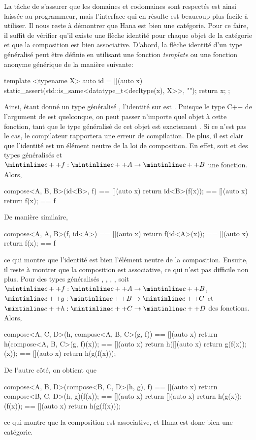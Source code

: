 La tâche de s'assurer que les domaines et codomaines sont respectés est ainsi
laissée au programmeur, mais l'interface qui en résulte est beaucoup plus
facile à utiliser. Il nous reste à démontrer que Hana est bien une catégorie.
Pour ce faire, il suffit de vérifier qu'il existe une flèche identité pour
chaque objet de la catégorie et que la composition est bien associative.
D'abord, la flèche identité d'un type généralisé peut être définie en
utilisant une fonction \textit{template} ou une fonction anonyme générique
de la manière suivante:
\begin{cpp}
    template <typename X>
    auto id = [](auto x) {
        static_assert(std::is_same<datatype_t<decltype(x), X>>{}, "");
        return x;
    };
\end{cpp}

Ainsi, étant donné un type généralisé , l'identité sur  est
. Puisque le type C++ de l'argument de  est quelconque,
on peut passer n'importe quel objet à cette fonction, tant que le type
généralisé de cet objet est exactement . Si ce n'est pas le cas,
le compilateur rapportera une erreur de compilation. De plus, il est clair
que l'identité est un élément neutre de la loi de composition. En effet, soit
 et  des types généralisés et $\cc{f} : \cc{A} \to \cc{B}$
une fonction. Alors,
\begin{cpp}
    compose<A, B, B>(id<B>, f) == [](auto x) { return id<B>(f(x)); }
                               == [](auto x) { return f(x); }
                               == f
\end{cpp}

De manière similaire,
\begin{cpp}
    compose<A, A, B>(f, id<A>) == [](auto x) { return f(id<A>(x)); }
                               == [](auto x) { return f(x); }
                               == f
\end{cpp}

ce qui montre que l'identité est bien l'élément neutre de la composition.
Ensuite, il reste à montrer que la composition est associative, ce qui n'est
pas difficile non plus. Pour des types généralisés , , ,
, soit $\cc{f} : \cc{A} \to \cc{B}$, $\cc{g} : \cc{B} \to \cc{C}$ et
$\cc{h} : \cc{C} \to \cc{D}$ des fonctions. Alors,
\begin{cpp}
    compose<A, C, D>(h, compose<A, B, C>(g, f))
        == [](auto x) { return h(compose<A, B, C>(g, f)(x)); }
        == [](auto x) { return h([](auto x) { return g(f(x)); }(x)); }
        == [](auto x) { return h(g(f(x))); }
\end{cpp}

De l'autre côté, on obtient que
\begin{cpp}
    compose<A, B, D>(compose<B, C, D>(h, g), f)
        == [](auto x) { return compose<B, C, D>(h, g)(f(x)); }
        == [](auto x) { return [](auto x) { return h(g(x)); }(f(x)); }
        == [](auto x) { return h(g(f(x))); }
\end{cpp}

ce qui montre que la composition est associative, et Hana est donc bien une
catégorie.
